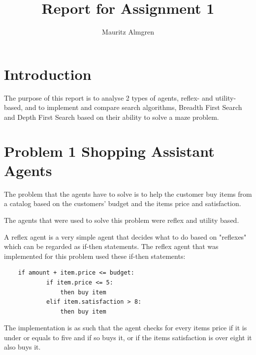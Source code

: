 \documentclass[runningheads]{llncs}
\begin{document}
%
\title{Report for Assignment 1}
%
%
\author{Mauritz Almgren\\ }

%
%
%
\maketitle              %
%

\section{Introduction}

The purpose of this report is to analyse 2 types of agents, reflex- and utility-based, and to implement and compare search algorithms, Breadth First Search and Depth First Search based on their ability to solve a maze problem.

\section{Problem 1 Shopping Assistant Agents}

The problem that the agents have to solve is to help the customer buy items from a catalog based on the customers' budget and the items price and satisfaction. 

The agents that were used to solve this problem were reflex and utility based. 

A reflex agent is a very simple agent that decides what to do based on "reflexes" which can be regarded as if-then statements. The reflex agent that was implemented for this problem used these if-then statements:
\begin{verbatim}
    if amount + item.price <= budget:
            if item.price <= 5:
                then buy item
            elif item.satisfaction > 8:
                then buy item
\end{verbatim}

The implementation is as such that the agent checks for every items price if it is under or equals to five and if so buys it, or if the items satisfaction is over eight it also buys it. \newline
\end{document}
